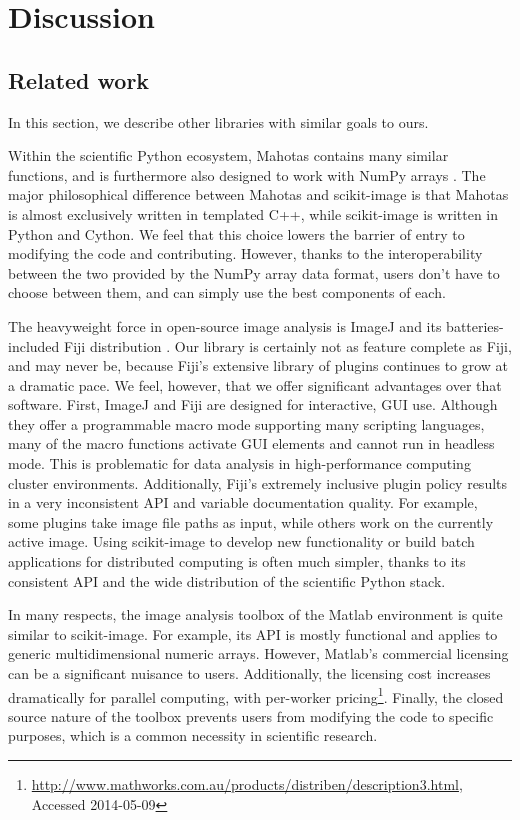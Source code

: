 
\section*{Discussion}
  \label{sec:discussion}

  \subsection*{Related work}

  In this section, we describe other libraries with similar goals to ours.
  
  Within the scientific Python ecosystem, Mahotas contains many similar
  functions, and is furthermore also designed to work with NumPy arrays
  \citep{Mahotas}. The major philosophical difference between Mahotas and
  scikit-image is that Mahotas is almost exclusively written in templated C++,
  while scikit-image is written in Python and Cython. We feel that this choice
  lowers the barrier of entry to modifying the code and contributing. However,
  thanks to the interoperability between the two provided by the NumPy array
  data format, users don't have to choose between them, and can simply use the
  best components of each.

  The heavyweight force in open-source image analysis is ImageJ and its
  batteries-included Fiji distribution \citep{Fiji}. Our library is
  certainly not as feature complete as Fiji, and may never be, because Fiji's
  extensive library of plugins continues to grow at a dramatic pace. We feel,
  however, that we offer significant advantages over that software. First,
  ImageJ and Fiji are designed for interactive, GUI use. Although they offer a
  programmable macro mode supporting many scripting languages, many of the
  macro functions activate GUI elements and cannot run in headless mode. This
  is problematic for data analysis in high-performance computing cluster
  environments. Additionally, Fiji's extremely inclusive plugin policy results
  in a very inconsistent API and variable documentation quality. For example,
  some plugins take image file paths as input, while others work on the
  currently active image. Using scikit-image to develop new functionality or
  build batch applications for distributed computing is often much simpler,
  thanks to its consistent API and the wide distribution of the scientific
  Python stack.

  In many respects, the image analysis toolbox of the Matlab environment is
  quite similar to scikit-image. For example, its API is mostly functional and
  applies to generic multidimensional numeric arrays. However, Matlab's
  commercial licensing can be a significant nuisance to users. Additionally,
  the licensing cost increases dramatically for parallel computing, with
  per-worker pricing\footnote{\url{http://www.mathworks.com.au/products/distriben/description3.html}, Accessed 2014-05-09}.
  Finally, the closed source nature of the toolbox prevents users from
  modifying the code to specific purposes, which is a common necessity in
  scientific research.

